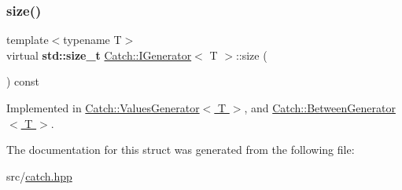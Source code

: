 \subsubsection{\texorpdfstring{size()}{size()}}
{\footnotesize\ttfamily template$<$typename T$>$ \\
virtual \textbf{ std\+::size\+\_\+t} \hyperlink{struct_catch_1_1_i_generator}{Catch\+::\+I\+Generator}$<$ T $>$\+::size (\begin{DoxyParamCaption}{ }\end{DoxyParamCaption}) const\hspace{0.3cm}{\ttfamily [pure virtual]}}



Implemented in \hyperlink{class_catch_1_1_values_generator_a9aa5b140ee502975cf35115e534ab771}{Catch\+::\+Values\+Generator$<$ T $>$}, and \hyperlink{class_catch_1_1_between_generator_af65a1fe51f9b1106fc676e3dd189adb6}{Catch\+::\+Between\+Generator$<$ T $>$}.



The documentation for this struct was generated from the following file\+:\begin{DoxyCompactItemize}
\item 
src/\hyperlink{catch_8hpp}{catch.\+hpp}\end{DoxyCompactItemize}
